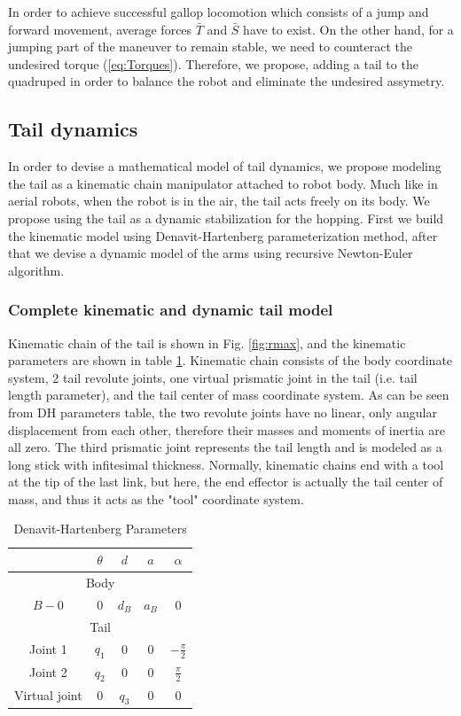 In order to achieve successful gallop locomotion which consists of a jump and forward movement, average forces $\bar{T}$ and $\bar{S}$ have to exist. On the other hand, for a jumping part of the maneuver to remain stable, we need to counteract the undesired torque (\ref{eq:Torques}). Therefore, we propose, adding a tail to the quadruped in order to balance the robot and eliminate the undesired assymetry. 

\subsection{Tail dynamics}
In order to devise a mathematical model of tail dynamics, we propose modeling the tail as a kinematic chain manipulator attached to robot body. Much like in aerial robots, when the robot is in the air, the tail acts freely on its body. We propose using the tail as a dynamic stabilization for the hopping. First we build the kinematic model using Denavit-Hartenberg parameterization method, after that we devise a dynamic model of the arms using recursive Newton-Euler algorithm.
\subsubsection{Complete kinematic and dynamic tail model}
Kinematic chain of the tail is shown in Fig. \ref{fig:rmax}, and the kinematic parameters are shown in table \ref{tab:DHParameters}. Kinematic chain consists of the body coordinate system, 2 tail revolute joints, one virtual prismatic joint in the tail (i.e. tail length parameter), and the tail center of mass coordinate system. As can be seen from DH parameters table, the two revolute joints have no linear, only angular displacement from each other, therefore their masses and moments of inertia are all zero. The third prismatic joint represents the tail length and is modeled as a long stick with infitesimal thickness. Normally, kinematic chains end with a tool at the tip of the last link, but here, the end effector is actually the tail center of mass, and thus it acts as the "tool" coordinate system.

\begin{table}
	\centering
		\begin{tabular}{ccccc}
		\hline
			& $\theta$ & $d$ & $a$ & $\alpha$ \\\hline
			\multicolumn{5}{c}{Body}\\\hline
			$B-0$ & $0$ & $d_B$ & $a_B$ & $0$\\\hline
			\multicolumn{5}{c}{Tail}\\\hline
			Joint 1 & $q_1$ & $0$ & $0$ & $-\frac{\pi}{2}$\\
			Joint 2 & $q_2$ & $0$ & $0$ & $\frac{\pi}{2}$\\
			Virtual joint& $0$ & $q_3$ & $0$ & $0$\\\hline
		\end{tabular}
	\caption{Denavit-Hartenberg Parameters}\label{tab:DHParameters}
\end{table}

